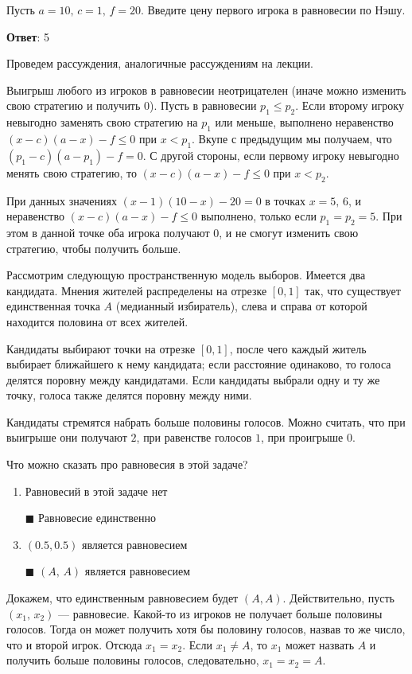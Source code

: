 	Пусть $a = 10,\, c = 1,\, f = 20$. Введите цену первого игрока в равновесии по Нэшу.
	
	\textbf{Ответ}: 5
	
	\solution
	Проведем рассуждения, аналогичные рассуждениям на лекции.
	
	Выигрыш любого из игроков в равновесии неотрицателен (иначе можно изменить свою стратегию и получить 0). Пусть в равновесии $p_1 \leq p_2$. Если второму игроку невыгодно заменять свою стратегию на $p_1$ или меньше, выполнено неравенство $(x-c)(a-x)-f \leq 0$ при $x < p_1$. Вкупе с предыдущим мы получаем, что $(p_1-c)(a-p_1)-f = 0$. С другой стороны, если первому игроку невыгодно менять свою стратегию, то $(x-c)(a-x)-f \leq 0$ при $x < p_2$.
	
	При данных значениях $(x-1)(10-x)-20 = 0$ в точках $x=5,\, 6$, и неравенство $(x-c)(a-x)-f \leq 0$ выполнено, только если $p_1=p_2=5$. При этом в данной точке оба игрока получают $0$, и не смогут изменить свою стратегию, чтобы получить больше.
	
	\task
	Рассмотрим следующую пространственную модель выборов. Имеется два кандидата. Мнения жителей распределены на отрезке $[0,1]$ так, что существует единственная точка $A$ (медианный избиратель), слева и справа от которой находится половина от всех жителей.
	
	Кандидаты выбирают точки на отрезке $[0,1]$, после чего каждый житель выбирает ближайшего к нему кандидата; если расстояние одинаково, то голоса делятся поровну между кандидатами. Если кандидаты выбрали одну и ту же точку, голоса также делятся поровну между ними.
	
	Кандидаты стремятся набрать больше половины голосов. Можно считать, что при выигрыше они получают $2$, при равенстве голосов $1$, при проигрыше $0$.
	
	Что можно сказать про равновесия в этой задаче?
	
	\begin{enumerate}[label=$\square$]
		\item Равновесий в этой задаче нет
		\item[$\blacksquare$] Равновесие единственно
		\item $(0.5, 0.5)$ является равновесием
		\item[$\blacksquare$] $(A,\, A)$ является равновесием
	\end{enumerate}
	
	\solution
	Докажем, что единственным равновесием будет $(A,A)$. Действительно, пусть $(x_1,\, x_2)$ --- равновесие. Какой-то из игроков не получает больше половины голосов. Тогда он может получить хотя бы половину голосов, назвав то же число, что и второй игрок. Отсюда $x_1=x_2$. Если $x_1 \neq A$, то $x_1$ может назвать $A$ и получить больше половины голосов, следовательно, $x_1=x_2=A$.
	
